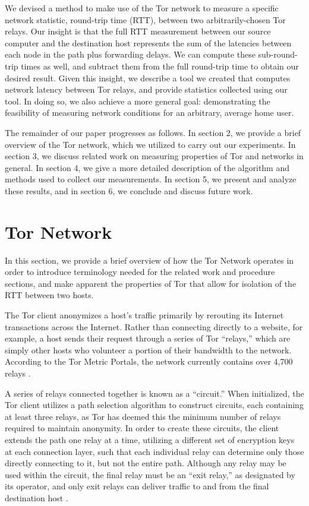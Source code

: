 \documentclass[twocolumn,11pt]{article}
\begin{document}
We devised a method to make use of the Tor network to measure a specific network statistic, round-trip time (RTT), between two arbitrarily-chosen Tor relays. Our insight is that the full RTT measurement between our source computer and the destination host represents the sum of the latencies between each node in the path plus forwarding delays. We can compute these sub-round-trip times as well, and subtract them from the full round-trip time to obtain our desired result. Given this insight, we describe a tool we created that computes network latency between Tor relays, and provide statistics collected using our tool. In doing so, we also achieve a more general goal: demonstrating the feasibility of measuring network conditions for an arbitrary, average home user.

The remainder of our paper progresses as follows. In section 2, we provide a brief overview of the Tor network, which we utilized to carry out our experiments. In section 3, we discuss related work on measuring properties of Tor and networks in general. In section 4, we give a more detailed description of the algorithm and methods used to collect our measurements. In section 5, we present and analyze these results, and in section 6, we conclude and discuss future work.

\section{Tor Network}

In this section, we provide a brief overview of how the Tor Network operates in order to introduce terminology needed for the related work and procedure sections, and make apparent the properties of Tor that allow for isolation of the RTT between two hosts. 

The Tor client anonymizes a host's traffic primarily by rerouting its Internet transactions across the Internet. Rather than connecting directly to a website, for example, a host sends their request through a series of Tor ``relays,'' which are simply other hosts who volunteer a portion of their bandwidth to the network. According to the Tor Metric Portals, the network currently contains over 4,700 relays \cite{Tor_Metrics_Portal}. 

A series of relays connected together is known as a ``circuit.'' When initialized, the Tor client utilizes a path selection algorithm to construct circuits, each containing at least three relays, as Tor has deemed this the minimum number of relays required to maintain anonymity. In order to create these circuits, the client extends the path one relay at a time, utilizing a different set of encryption keys at each connection layer, such that each individual relay can determine only those directly connecting to it, but not the entire path. Although any relay may be used within the circuit, the final relay must be an ``exit relay,'' as designated by its operator, and only exit relays can deliver traffic to and from the final destination host \cite{tor_about}.
\end{document}
